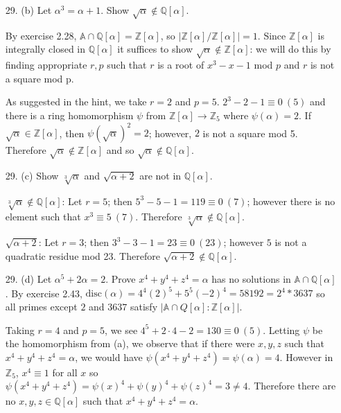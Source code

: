 \documentclass{article}
\newcommand{\Q}[0]{\mathbb{Q}}
\newcommand{\Z}[0]{\mathbb{Z}}
\newcommand{\disc}[1]{\text{disc}(#1)}
\newcommand{\ringofintegers}[1]{\mathbb{A} \cap #1}
\begin{document}
\begin{enumerate}
\item[29. (b)] Let $\alpha^3 = \alpha + 1$.  Show $\sqrt{\alpha} \not\in \Q[\alpha]$.

    By exercise 2.28, $\ringofintegers{\Q[\alpha]} = \Z[\alpha]$, so $|\Z[\alpha]/\Z[\alpha]| = 1$.  Since $\Z[\alpha]$ is integrally closed in $\Q[\alpha]$ it suffices to show $\sqrt{\alpha} \not\in \Z[\alpha]$: we will do this by finding appropriate $r, p$ such that $r$ is a root of $x^3 - x - 1$ mod $p$ and $r$ is not a square mod p.

    As suggested in the hint, we take $r = 2$ and $p = 5$.  $2^3 - 2 - 1 \equiv 0\ (5)$ and there is a ring homomorphism $\psi$ from $\Z[\alpha] \to \Z_5$ where $\psi(\alpha) = 2$.  If $\sqrt{\alpha} \in \Z[\alpha]$, then $\psi(\sqrt{\alpha})^2 = 2$; however, $2$ is not a square mod 5.  Therefore $\sqrt{\alpha} \not\in \Z[\alpha]$ and so $\sqrt{\alpha} \not\in \Q[\alpha]$.

\item[29. (c)] Show $\sqrt[3]{\alpha}$ and $\sqrt{\alpha + 2}$ are not in $\Q[\alpha]$.

{\bf $\sqrt[3]{\alpha} \not\in \Q[\alpha]$}:  Let $r = 5$; then $5^3 - 5 - 1 = 119 \equiv 0\ (7)$; however there is no element such that $x^3 \equiv 5\ (7)$.  Therefore $\sqrt[3]{\alpha} \not\in \Q[\alpha]$.

{\bf $\sqrt{\alpha + 2}$}:  Let $r = 3$; then $3^3 - 3 - 1 = 23 \equiv 0\ (23)$; however $5$ is not a quadratic residue mod 23.  Therefore $\sqrt{\alpha + 2} \not\in \Q[\alpha]$.

\item[29. (d)] Let $\alpha^5 + 2\alpha = 2$.  Prove $x^4 + y^4 + z^4 = \alpha$ has no solutions in $\ringofintegers{\Q[\alpha]}$.  By exercise 2.43, $\disc{\alpha} = 4^4 (2)^5 + 5^5 (-2)^4 = 58192 = 2^4 * 3637$ so all primes except $2$ and $3637$ satisfy $|\ringofintegers{Q[\alpha]} : \Z[\alpha]|$.

Taking $r = 4$ and $p = 5$, we see $4^5 + 2\cdot 4 - 2 = 130 \equiv 0\ (5)$.  Letting $\psi$ be the homomorphism from (a), we observe that if there were $x, y, z$ such that $x^4 + y^4 + z^4 = \alpha$, we would have $\psi(x^4 + y^4 + z^4) = \psi(\alpha) = 4$.  However in $\Z_5$, $x^4 \equiv 1$ for all $x$ so $\psi(x^4 + y^4 + z^4) = \psi(x)^4 + \psi(y)^4 + \psi(z)^4 = 3 \neq 4$.  Therefore there are no $x, y, z \in \Q[\alpha]$ such that $x^4 + y^4 + z^4 = \alpha$.

\end{enumerate}
\end{document}
